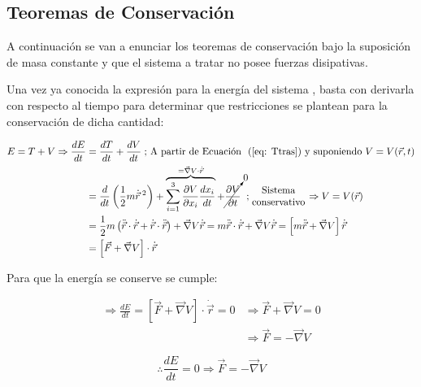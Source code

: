 \documentclass[/home/hernan-barquero/Documents/Apuntes_mecanica_teorica/main.tex]{subfiles}
\begin{document}
	\subsection{Teoremas de Conservación}

	A continuación se van a enunciar los teoremas de conservación bajo la suposición de masa constante y que el sistema a tratar no posee fuerzas disipativas.


	\begin{theorem}
		Una vez ya conocida la expresión para la energía del sistema , basta con derivarla con respecto al tiempo para determinar que restricciones se plantean para la conservación de dicha cantidad:

		\begin{align*}
			E = T + V \Rightarrow \frac{dE}{dt} & = \frac{dT}{dt} + \frac{dV}{dt} \; \textup{; A partir de \Eqref{eq: Ttras} y suponiendo $V = V(\vec{r}, t)$}\\
												& = \frac{d}{dt} \left(\frac{1}{2} m \dot{\vec{r}}\:^{2}\right) + \overbrace{\sum_{i=1}^{3} \frac{\partial V}{\partial x_{i}} \frac{d x_{i}}{d t}}^{= \vec{\nabla}V \cdot \dot{\vec{r}}} + \cancelto{0}{\frac{\partial V}{\partial t}} \; \; ; \left .\begin{matrix}
													\textup{Sistema}\\ 
													\textup{conservativo}
													\end{matrix} \right . \Rightarrow V = V(\vec{r}) \\
												& = \frac{1}{2} m \left(\ddot{\vec{r}} \cdot \dot{\vec{r}} + \dot{\vec{r}} \cdot \ddot{\vec{r}}\right) + \vec{\nabla} V \dot{\vec{r}} 
												= m \ddot{\vec{r}} \cdot \dot{\vec{r}} + \vec{\nabla} V \dot{\vec{r}}
												= \left[m \ddot{\vec{r}} +   \vec{\nabla} V \right] \dot{\vec{r}}\\
												& = \left[\vec{F} + \vec{\nabla} V \right] \cdot \dot{\vec{r}}\\
		\end{align*}

		Para que la energía se conserve se cumple:

		\begin{align*}
			\Rightarrow \frac{dE}{dt} = \left[\vec{F} + \vec{\nabla} V \right] \cdot \dot{\vec{r}} = 0
			&\Rightarrow \vec{F} + \vec{\nabla} V = 0\\
			& \Rightarrow \vec{F} = - \vec{\nabla} V 
		\end{align*}

		\begin{equation}
			\therefore \frac{dE}{dt} = 0 \Rightarrow  \vec{F} = - \vec{\nabla} V
			\label{eq: Econs}
		\end{equation}
		
	\end{theorem}
\end{document}
